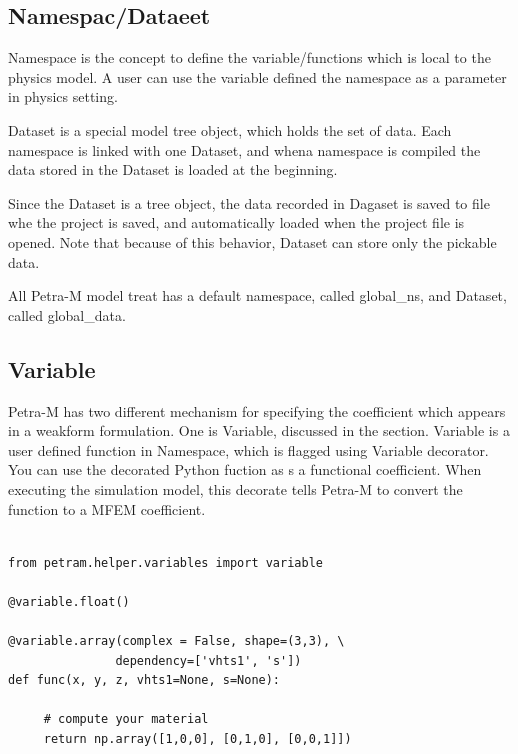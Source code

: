 \documentclass[11pt,a4paper,final]{report}
\begin{document}
\subsection{Namespac/Dataeet}
Namespace is the concept to define the variable/functions which is local to the physics model. 
A user can use the variable defined the namespace as a parameter in physics setting. 

Dataset is a special model tree object, which holds the set of data. 
Each namespace is linked with one Dataset, and whena namespace is compiled the data stored in the Dataset is loaded at the beginning. 

Since the Dataset is a tree object, the data recorded in Dagaset  is saved to file whe the project is saved, and automatically loaded when the project file is opened.
Note that because of this behavior, Dataset can store only the pickable data. 

All Petra-M model treat has a default namespace, called global\_ns, and Dataset, called global\_data.

\subsection{Variable}
Petra-M has two different mechanism for specifying the coefficient which appears in a weakform formulation. One is Variable, discussed in the section.
Variable is a user defined function in Namespace, which is flagged using Variable decorator.
You can use the decorated Python fuction as s a functional coefficient.
When executing the simulation model, this decorate tells Petra-M to convert the function to a MFEM coefficient. 

\begin{minipage}[c]{0.95\textwidth}
\begin{lstlisting}[caption={A user defined generic preconditioner},captionpos=b, frame=single, label={function1}]

from petram.helper.variables import variable

@variable.float()

@variable.array(complex = False, shape=(3,3), \
               dependency=['vhts1', 's'])
def func(x, y, z, vhts1=None, s=None):

     # compute your material
     return np.array([1,0,0], [0,1,0], [0,0,1]])

\end{lstlisting}
 \end{minipage}
 
\end{document}
